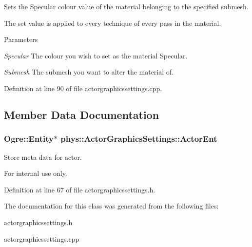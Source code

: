 Sets the Specular colour value of the material belonging to the specified submesh. 

The set value is applied to every technique of every pass in the material. 
\begin{DoxyParams}{Parameters}
\item[{\em Specular}]The colour you wish to set as the material Specular. \item[{\em Submesh}]The submesh you want to alter the material of. \end{DoxyParams}


Definition at line 90 of file actorgraphicssettings.cpp.



\subsection{Member Data Documentation}
\hypertarget{classphys_1_1ActorGraphicsSettings_a256f2b713dbfe39007708600e58bf2f7}{
\subsubsection[{ActorEnt}]{\setlength{\rightskip}{0pt plus 5cm}Ogre::Entity$\ast$ {\bf phys::ActorGraphicsSettings::ActorEnt}}}
\label{dd/dd6/classphys_1_1ActorGraphicsSettings_a256f2b713dbfe39007708600e58bf2f7}


Store meta data for actor. 

\begin{DoxyInternal}{For internal use only.}
\end{DoxyInternal}


Definition at line 67 of file actorgraphicssettings.h.



The documentation for this class was generated from the following files:\begin{DoxyCompactItemize}
\item 
actorgraphicssettings.h\item 
actorgraphicssettings.cpp\end{DoxyCompactItemize}
